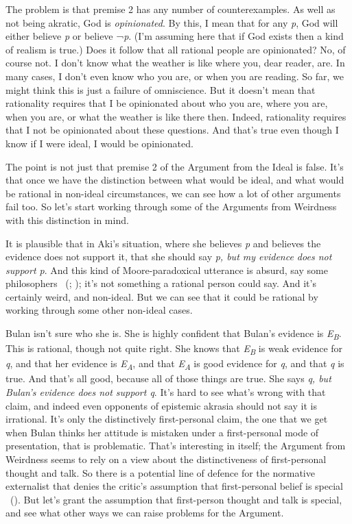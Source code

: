 \documentclass[
  10pt,
  letterpaper,
  twoside]{scrbook}
\begin{document}
The problem is that premise 2 has any number of counterexamples. As well
as not being akratic, God is \emph{opinionated}. By this, I mean that
for any \emph{p}, God will either believe \emph{p} or believe ¬\emph{p}.
(I'm assuming here that if God exists then a kind of realism is true.)
Does it follow that all rational people are opinionated? No, of course
not. I don't know what the weather is like where you, dear reader, are.
In many cases, I don't even know who you are, or when you are reading.
So far, we might think this is just a failure of omniscience. But it
doesn't mean that rationality requires that I be opinionated about who
you are, where you are, when you are, or what the weather is like there
then. Indeed, rationality requires that I not be opinionated about these
questions. And that's true even though I know if I were ideal, I would
be opinionated.

The point is not just that premise 2 of the Argument from the Ideal is
false. It's that once we have the distinction between what would be
ideal, and what would be rational in non-ideal circumstances, we can see
how a lot of other arguments fail too. So let's start working through
some of the Arguments from Weirdness with this distinction in mind.

It is plausible that in {Aki}'s situation, where she believes \emph{p}
and believes the evidence does not support it, that she should say
\emph{p, but my evidence does not support p}. And this kind of
Moore-paradoxical utterance is absurd, say some philosophers
~(;
); it's not something a rational
person could say. And it's certainly weird, and non-ideal. But we can
see that it could be rational by working through some other non-ideal
cases.

{Bulan} isn't sure who she is. She is highly confident that {Bulan}'s
evidence is \emph{E\textsubscript{B}}. This is rational, though not
quite right. She knows that \emph{E\textsubscript{B}} is weak evidence
for \emph{q}, and that her evidence is \emph{E\textsubscript{A}}, and
that \emph{E\textsubscript{A}} is good evidence for \emph{q}, and that
\emph{q} is true. And that's all good, because all of those things are
true. She says \emph{q, but Bulan's evidence does not support q}. It's
hard to see what's wrong with that claim, and indeed even opponents of
epistemic akrasia should not say it is irrational. It's only the
distinctively first-personal claim, the one that we get when {Bulan}
thinks her attitude is mistaken under a first-personal mode of
presentation, that is problematic. That's interesting in itself; the
Argument from Weirdness seems to rely on a view about the
distinctiveness of first-personal thought and talk. So there is a
potential line of defence for the normative externalist that denies the
critic's assumption that first-personal belief is special
~(). But let's
grant the assumption that first-person thought and talk is special, and
see what other ways we can raise problems for the Argument.
\end{document}
